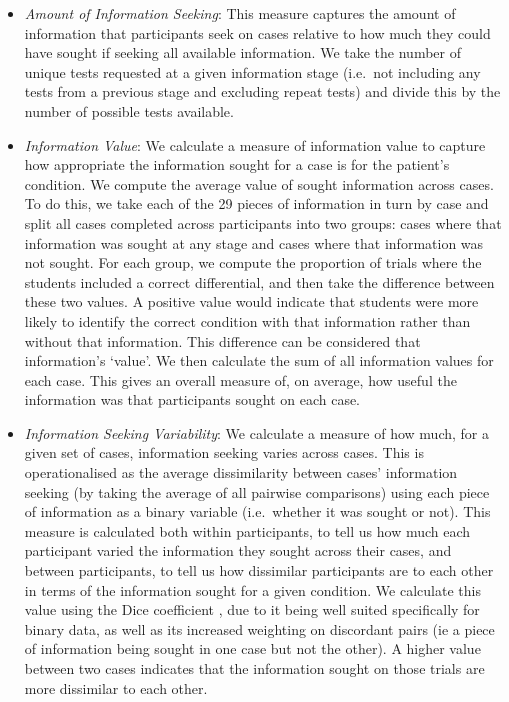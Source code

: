\documentclass[a4paper, nobind]{templates/ociamthesis}
\begin{document}
\begin{itemize}
\item
  \emph{Amount of Information Seeking}: This measure captures the amount of information that participants seek on cases relative to how much they could have sought if seeking all available information. We take the number of unique tests requested at a given information stage (i.e.~not including any tests from a previous stage and excluding repeat tests) and divide this by the number of possible tests available.
\item
  \emph{Information Value}: We calculate a measure of information value to capture how appropriate the information sought for a case is for the patient's condition. We compute the average value of sought information across cases. To do this, we take each of the 29 pieces of information in turn by case and split all cases completed across participants into two groups: cases where that information was sought at any stage and cases where that information was not sought. For each group, we compute the proportion of trials where the students included a correct differential, and then take the difference between these two values. A positive value would indicate that students were more likely to identify the correct condition with that information rather than without that information. This difference can be considered that information's `value'. We then calculate the sum of all information values for each case. This gives an overall measure of, on average, how useful the information was that participants sought on each case.
\item
  \emph{Information Seeking Variability}: We calculate a measure of how much, for a given set of cases, information seeking varies across cases. This is operationalised as the average dissimilarity between cases' information seeking (by taking the average of all pairwise comparisons) using each piece of information as a binary variable (i.e.~whether it was sought or not). This measure is calculated both within participants, to tell us how much each participant varied the information they sought across their cases, and between participants, to tell us how dissimilar participants are to each other in terms of the information sought for a given condition. We calculate this value using the Dice coefficient \autocite{dice_measures_1945}, due to it being well suited specifically for binary data, as well as its increased weighting on discordant pairs (ie a piece of information being sought in one case but not the other). A higher value between two cases indicates that the information sought on those trials are more dissimilar to each other.
\end{itemize}
\end{document}

